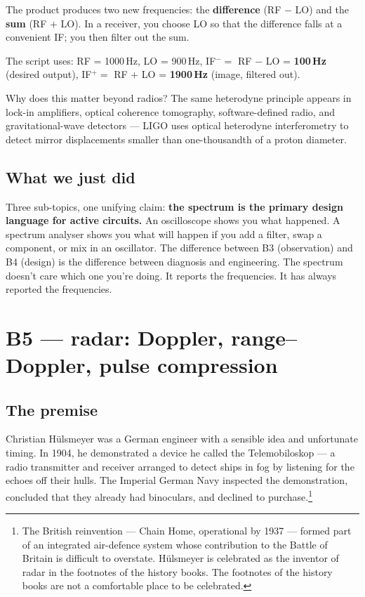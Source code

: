 \documentclass[11pt,a4paper,openany]{book}
\begin{document}
The product produces two new frequencies: the \textbf{difference} (RF $-$ LO)
and the \textbf{sum} (RF $+$ LO). In a receiver, you choose LO so that the
difference falls at a convenient IF; you then filter out the sum.

The script uses: RF = 1000\,Hz, LO = 900\,Hz, IF$^- =$ RF $-$ LO = \textbf{100\,Hz}
(desired output), IF$^+ =$ RF $+$ LO = \textbf{1900\,Hz} (image, filtered out).

Why does this matter beyond radios? The same heterodyne principle appears in
lock-in amplifiers, optical coherence tomography, software-defined radio, and
gravitational-wave detectors --- LIGO uses optical heterodyne interferometry
to detect mirror displacements smaller than one-thousandth of a proton
diameter.

\section{What we just did}

Three sub-topics, one unifying claim: \textbf{the spectrum is the primary
design language for active circuits.} An oscilloscope shows you what happened.
A spectrum analyser shows you what will happen if you add a filter, swap a
component, or mix in an oscillator. The difference between B3 (observation)
and B4 (design) is the difference between diagnosis and engineering. The
spectrum doesn't care which one you're doing. It reports the frequencies. It
has always reported the frequencies.

\chapter{B5 --- radar: Doppler, range--Doppler, pulse compression}
\label{ch:b5}

\section{The premise}

Christian H\"{u}lsmeyer was a German engineer with a sensible idea and
unfortunate timing. In 1904, he demonstrated a device he called the
Telemobiloskop --- a radio transmitter and receiver arranged to detect ships
in fog by listening for the echoes off their hulls. The Imperial German Navy
inspected the demonstration, concluded that they already had binoculars, and
declined to purchase.\footnote{The British reinvention --- Chain Home,
operational by 1937 --- formed part of an integrated air-defence system whose
contribution to the Battle of Britain is difficult to overstate.
H\"{u}lsmeyer is celebrated as the inventor of radar in the footnotes of the
history books. The footnotes of the history books are not a comfortable place
to be celebrated.}
\end{document}
